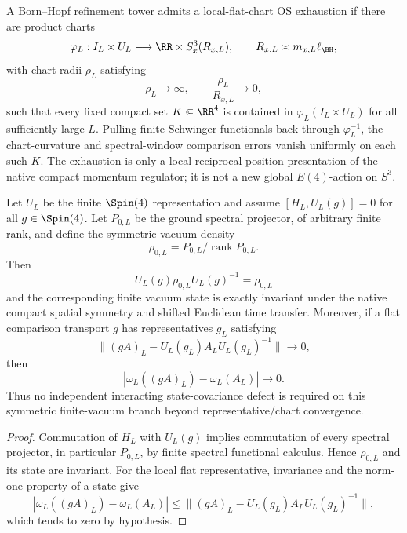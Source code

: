 \documentclass[12pt,a4paper]{article}
\begin{document}
\begin{definition}
\label{p12:def:local-flat-chart-os-exhaustion}
A Born--Hopf refinement tower admits a local-flat-chart OS exhaustion if there are product charts
\[
\varphi_L:I_L\times U_L\longrightarrow \RR\times S^3_x(R_{x,L}),
\qquad R_{x,L}\asymp m_{x,L}\ell_{\BH},
\]
with chart radii \(\rho_L\) satisfying
\begin{equation}
\label{p12:eq:local-chart-exhaustion-radii}
\rho_L\longrightarrow\infty,
\qquad
\frac{\rho_L}{R_{x,L}}\longrightarrow0,
\end{equation}
such that every fixed compact set \(K\Subset\RR^4\) is contained in \(\varphi_L(I_L\times U_L)\) for all sufficiently large \(L\).  Pulling finite Schwinger functionals back through \(\varphi_L^{-1}\), the chart-curvature and spectral-window comparison errors vanish uniformly on each such \(K\).  The exhaustion is only a local reciprocal-position presentation of the native compact momentum regulator; it is not a new global \(E(4)\)-action on \(S^3\).
\end{definition}

\begin{theorem}
\label{p12:thm:native-bh-covariance}
Let \(U_L\) be the finite \(\Spin(4)\) representation and assume \([H_L,U_L(g)]=0\) for all \(g\in\Spin(4)\).  Let \(P_{0,L}\) be the ground spectral projector, of arbitrary finite rank, and define the symmetric vacuum density
\[
 \rho_{0,L}=P_{0,L}/\operatorname{rank}P_{0,L}.
\]
Then
\[
 U_L(g)\rho_{0,L}U_L(g)^{-1}=\rho_{0,L}
\]
and the corresponding finite vacuum state is exactly invariant under the native compact spatial symmetry and shifted Euclidean time transfer.  Moreover, if a flat comparison transport \(g\) has representatives \(g_L\) satisfying
\[
 \|(gA)_L-U_L(g_L)A_LU_L(g_L)^{-1}\|\to0,
\]
then
\[
 |\omega_L((gA)_L)-\omega_L(A_L)|\to0.
\]
Thus no independent interacting state-covariance defect is required on this symmetric finite-vacuum branch beyond representative/chart convergence.
\end{theorem}
\begin{proof}
Commutation of \(H_L\) with \(U_L(g)\) implies commutation of every spectral projector, in particular \(P_{0,L}\), by finite spectral functional calculus.  Hence \(\rho_{0,L}\) and its state are invariant.  For the local flat representative, invariance and the norm-one property of a state give
\[
 |\omega_L((gA)_L)-\omega_L(A_L)|
 \le \|(gA)_L-U_L(g_L)A_LU_L(g_L)^{-1}\|,
\]
which tends to zero by hypothesis.
\end{proof}
\end{document}
